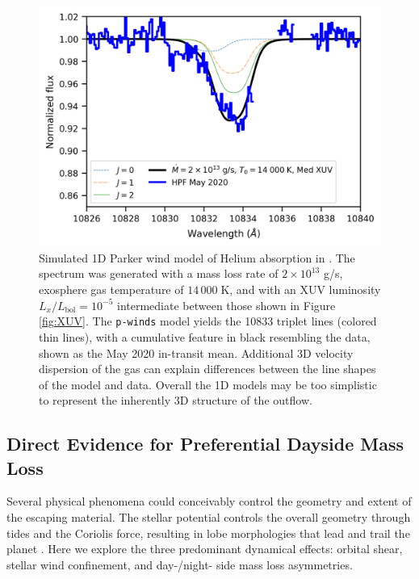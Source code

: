\documentclass[linenumbers, twocolumn, trackchanges]{aastex631}
\newcommand{\hatpb}{\object{HAT-P-67 b}}
\begin{document}
\begin{figure}
  \includegraphics[width=\linewidth]{pwinds_May2020_14000_2e13Mdot_medXUV_formal_rv_rev.png}
  \caption{Simulated 1D Parker wind model of Helium absorption in \hatpb.  The spectrum was generated with a mass loss rate of $2\times10^{13}$ g/s, exosphere gas temperature of $14\,000\;$K, and with an XUV luminosity $L_x/L_\mathrm{bol}=10^{-5}$ intermediate between those shown in Figure \ref{fig:XUV}.  The \texttt{p-winds} model yields the  10833 triplet lines (colored thin lines), with a cumulative feature in black resembling the data, shown as the May 2020 in-transit mean.  Additional 3D velocity dispersion of the gas can explain differences between the line shapes of the model and data.  Overall the 1D models may be too simplistic to represent the inherently 3D structure of the outflow.}
  \label{fig:pwinds}
\end{figure}

\subsection{Direct Evidence for Preferential Dayside Mass Loss} \label{secLeading}
Several physical phenomena could conceivably control the geometry and extent of the escaping material.  The stellar potential controls the overall geometry through tides and the Coriolis force, resulting in lobe morphologies that lead and trail the planet \citep{2019ApJ...873...89M}.  Here we explore the three predominant dynamical effects: orbital shear, stellar wind confinement, and day-/night- side mass loss asymmetries.
\end{document}
